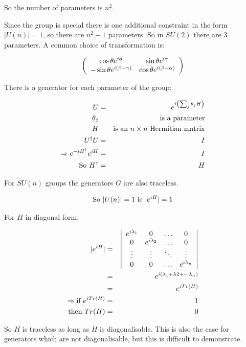 So the number of parameters is $n^2$.

Since the group is special there is one additional constraint in the form $|U(n)| = 1$, so there are $n^2-1$ parameters.  So in $SU(2)$ there are $3$ parameters.  A common choice of transformation is:

\[
  \left(
  \begin{array}{cc}
    \cos\theta e^{i\alpha} & \sin\theta e^{i\gamma} \\
    -\sin\theta e^{i(\beta - \gamma)} & \cos\theta e^{i(\beta - \alpha)}
  \end{array}
  \right)
\]

There is a generator for each parameter of the group:

\begin{eqnarray*}
  U & = & e^{i\left(\sum_j \theta_j H\right)} \\
  \theta_j & & \textrm{is a parameter} \\
  H & & \textrm{is an }n\times n\textrm{ Hermitian matrix} \\
  U^{\dagger}U & = & I \\
  \Rightarrow e^{-iH^{\dagger}}e^{iH} & = & I \\
  \textrm{So } H^{\dagger} & = & H
\end{eqnarray*}

For $SU(n)$ groups the generators $G$ are also traceless.

\[
  \textrm{So } |U(n)| = 1 \textrm{ ie } |e^{iH}| = 1
\]

For $H$ in diagonal form:

\begin{eqnarray*}
  |e^{iH}| & =&  \left|
  \begin{array}{cccc}
  e^{i\lambda_1} & 0 & \ldots & 0 \\
  0 & e^{i\lambda_2} & \ldots & 0 \\
  \vdots & \vdots & \ddots & \vdots \\
  0 & 0 & \ldots & e^{i\lambda_n}
  \end{array}
  \right| \\
  & = & e^{i(\lambda_1 + \lambda2 + \cdots \lambda_n)} \\
  & = & e^{iTr(H)} \\
  \Rightarrow \textrm{if } e^{iTr(H)} & = & 1 \\
  \textrm{then } Tr(H) & = & 0
\end{eqnarray*}

So $H$ is traceless as long as $H$ is diagonalisable.  This is also the case for generators which are not diagonalisable, but this is difficult to demonstrate.

